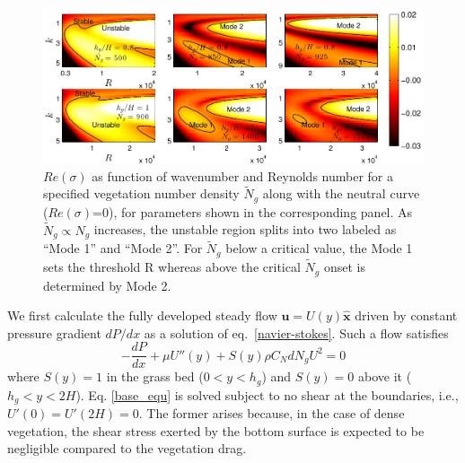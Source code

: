 \documentclass[aps,prl,twocolumn,superscriptaddress,10pt]{revtex4-1}  %
\newcommand{\bu}{\mathbf{u}}
\newcommand{\hg}{h_g}
\newcommand{\Rey}{\text{R}}
\newcommand{\Ndg}{\tilde{N}_g}
\begin{document}
\begin{figure}
 \includegraphics{SetAll_imgsc}

\caption{$Re(\sigma)$ as function of wavenumber and Reynolds number for a specified vegetation number density $\Ndg$ along with the neutral curve ($Re(\sigma)$=0), for parameters shown in the corresponding panel.  
As $\Ndg \propto N_g$ increases, the unstable region splits into two labeled as ``Mode 1'' and ``Mode 2''. 
For $\Ndg$ below a critical value, the Mode 1 sets the threshold $\Rey$ whereas above the critical $\Ndg$ onset is determined by Mode 2.}
\label{K_Re_sigma_set3}
\end{figure}
We first calculate the fully developed steady flow $\bu = U(y)\boldsymbol{\hat{x}}$ driven by constant pressure gradient $dP/dx$ as a solution of eq.~\eqref{navier-stokes}. 
Such a flow satisfies 
\begin{equation}
 -\frac{dP}{dx}+\mu U''(y) +S(y) \rho C_N d N_gU^2=0
\label{base_equ}
\end{equation}
where $S(y)=1$ in the grass bed ($0<y<\hg$) and $S(y)=0$ above it ($\hg< y< 2H$). 
Eq. \eqref{base_equ} is solved subject to no shear at the boundaries, i.e., $U'(0) = U'(2H) = 0$.
The former arises because, in the case of dense vegetation, the shear stress exerted by the bottom surface is expected to be negligible compared to the vegetation drag. 
\end{document}
